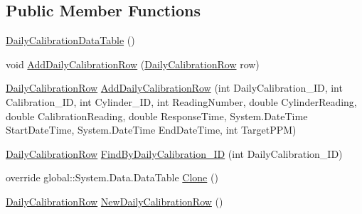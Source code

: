 \subsection*{Public Member Functions}
\begin{DoxyCompactItemize}
\item 
\hyperlink{class_env_int_1_1_win32_1_1_field_tech_1_1_manager_1_1_data_sets_1_1_guide_ware_mobile_data_set_5b380d875f3f569d74f6183f0c2ee8d7_a2e52557c0b4cd80b98ebc66507475e6f}{Daily\+Calibration\+Data\+Table} ()
\item 
void \hyperlink{class_env_int_1_1_win32_1_1_field_tech_1_1_manager_1_1_data_sets_1_1_guide_ware_mobile_data_set_5b380d875f3f569d74f6183f0c2ee8d7_aadd6bbe6b0b0c30271faca3565c512c9}{Add\+Daily\+Calibration\+Row} (\hyperlink{class_env_int_1_1_win32_1_1_field_tech_1_1_manager_1_1_data_sets_1_1_guide_ware_mobile_data_set_1_1_daily_calibration_row}{Daily\+Calibration\+Row} row)
\item 
\hyperlink{class_env_int_1_1_win32_1_1_field_tech_1_1_manager_1_1_data_sets_1_1_guide_ware_mobile_data_set_1_1_daily_calibration_row}{Daily\+Calibration\+Row} \hyperlink{class_env_int_1_1_win32_1_1_field_tech_1_1_manager_1_1_data_sets_1_1_guide_ware_mobile_data_set_5b380d875f3f569d74f6183f0c2ee8d7_af32b7c7c15fc39cb0981c667a6bac890}{Add\+Daily\+Calibration\+Row} (int Daily\+Calibration\+\_\+\+I\+D, int Calibration\+\_\+\+I\+D, int Cylinder\+\_\+\+I\+D, int Reading\+Number, double Cylinder\+Reading, double Calibration\+Reading, double Response\+Time, System.\+Date\+Time Start\+Date\+Time, System.\+Date\+Time End\+Date\+Time, int Target\+P\+P\+M)
\item 
\hyperlink{class_env_int_1_1_win32_1_1_field_tech_1_1_manager_1_1_data_sets_1_1_guide_ware_mobile_data_set_1_1_daily_calibration_row}{Daily\+Calibration\+Row} \hyperlink{class_env_int_1_1_win32_1_1_field_tech_1_1_manager_1_1_data_sets_1_1_guide_ware_mobile_data_set_5b380d875f3f569d74f6183f0c2ee8d7_a143370f7c7b251739582a1d8cadec24a}{Find\+By\+Daily\+Calibration\+\_\+\+I\+D} (int Daily\+Calibration\+\_\+\+I\+D)
\item 
override global\+::\+System.\+Data.\+Data\+Table \hyperlink{class_env_int_1_1_win32_1_1_field_tech_1_1_manager_1_1_data_sets_1_1_guide_ware_mobile_data_set_5b380d875f3f569d74f6183f0c2ee8d7_a5ab09785530b36a0bc9f5235dfb12360}{Clone} ()
\item 
\hyperlink{class_env_int_1_1_win32_1_1_field_tech_1_1_manager_1_1_data_sets_1_1_guide_ware_mobile_data_set_1_1_daily_calibration_row}{Daily\+Calibration\+Row} \hyperlink{class_env_int_1_1_win32_1_1_field_tech_1_1_manager_1_1_data_sets_1_1_guide_ware_mobile_data_set_5b380d875f3f569d74f6183f0c2ee8d7_aa4dfb9112d73684cd64048e501d2028a}{New\+Daily\+Calibration\+Row} ()

\end{DoxyCompactItemize}
